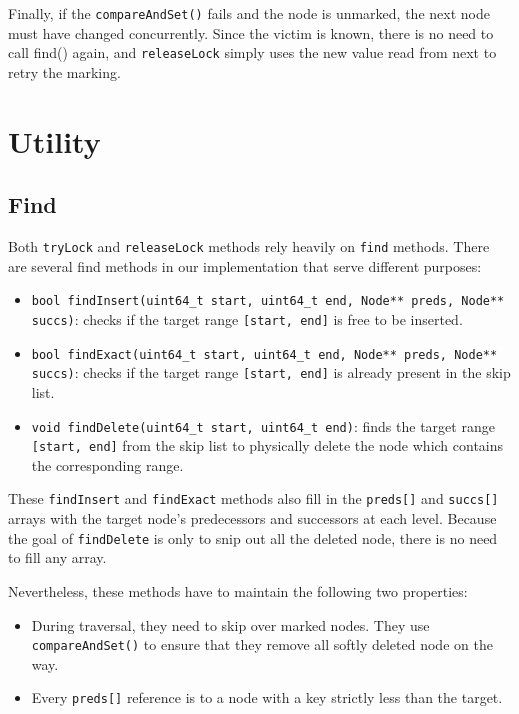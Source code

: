 Finally, if the \texttt{compareAndSet()} fails and the node is unmarked, the next node must have changed concurrently. 
Since the victim is known, there is no need to call find() again, and \texttt{releaseLock} simply uses the new value read from next to retry the marking.

\newpage

\section{Utility}

\subsection{Find}\label{subsec:find}

Both \texttt{tryLock} and \texttt{releaseLock} methods rely heavily on \texttt{find} methods.
There are several find methods in our implementation that serve different purposes:

\begin{itemize}
    \item \texttt{bool findInsert(uint64\_t start, uint64\_t end, Node** preds, Node** succs)}: checks if the target range \texttt{[start, end]} is free to be inserted.
    
    \item \texttt{bool findExact(uint64\_t start, uint64\_t end, Node** preds, Node** succs)}: checks if the target range \texttt{[start, end]} is already present in the skip list.
    
    \item \texttt{void findDelete(uint64\_t start, uint64\_t end)}: finds the target range \texttt{[start, end]} from the skip list to physically delete the node which contains the corresponding range.
\end{itemize}

These \texttt{findInsert} and \texttt{findExact} methods also fill in the \texttt{preds[]} and \texttt{succs[]} arrays with the target node's predecessors and successors at each level.
Because the goal of \texttt{findDelete} is only to snip out all the deleted node, there is no need to fill any array.

Nevertheless, these methods have to maintain the following two properties:

\begin{itemize}
    \item During traversal, they need to skip over marked nodes.
    They use \texttt{compareAndSet()} to ensure that they remove all softly deleted node on the way.
    \item Every \texttt{preds[]} reference is to a node with a key strictly less than the target.
\end{itemize}

